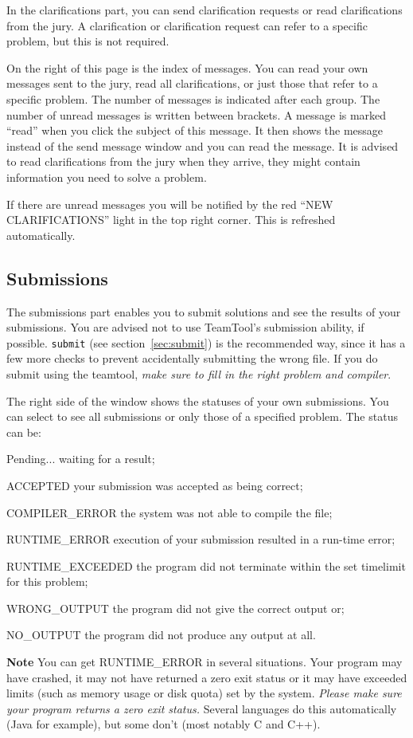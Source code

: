\documentclass[a4paper]{artikel3}
\newcommand{\cmd}[1]{\texttt{#1}}
\newcommand{\strong}[1]{\textbf{#1}}
\newenvironment{ddlist}[1]%
  {\begin{list}{}{\settowidth{\labelwidth}{\textbf{#1}}
   \setlength{\leftmargin}{\labelwidth}
   \addtolength{\leftmargin}{\labelsep}
   \renewcommand{\makelabel}[1]{\textbf{\hfill##1}}}}%
  {\end{list}}
\begin{document}
In the clarifications part, you can send clarification requests or read
clarifications from the jury. A clarification or clarification request can
refer to a specific problem, but this is not required.

On the right of this page is the index of messages. You can read your own
messages sent to the jury, read all clarifications, or just those that refer
to a specific problem. The number of messages is indicated after each group.
The number of unread messages is written between brackets. A message is
marked ``read'' when you click the subject of this message. It then shows
the message instead of the send message window and you can read the message.
It is advised to read clarifications from the jury when they arrive, they
might contain information you need to solve a problem.

If there are unread messages you will be notified by the red ``NEW
CLARIFICATIONS'' light in the top right corner. This is refreshed automatically.

\subsection{Submissions}

The submissions part enables you to submit solutions and see the results of
your submissions. You are advised not to use TeamTool's submission ability,
if possible. \cmd{submit} (see section~\ref{sec:submit}) is the recommended
way, since it has a few more checks to prevent accidentally submitting the
wrong file. If you do submit using the teamtool, \emph{make sure to fill in
the right problem and compiler}.

The right side of the window shows the statuses of your own submissions. You
can select to see all submissions or only those of a specified problem. The
status can be:

\begin{ddlist}{XRUNTIMEXEXCEEDED}
\item[Pending...] waiting for a result;
\item[ACCEPTED] your submission was accepted as being correct;
\item[COMPILER\_ERROR] the system was not able to compile the file;
\item[RUNTIME\_ERROR] execution of your submission resulted in a run-time
error;
\item[RUNTIME\_EXCEEDED] the program did not terminate within the set
timelimit for this problem;
\item[WRONG\_OUTPUT] the program did not give the correct output or;
\item[NO\_OUTPUT] the program did not produce any output at all.
\end{ddlist}

\strong{Note} You can get RUNTIME\_ERROR in several situations. Your program
may have crashed, it may not have returned a zero exit status or it may have
exceeded limits (such as memory usage or disk quota) set by the system.
\emph{Please make sure your program returns a zero exit status.} Several
languages do this automatically (Java for example), but some
don't (most notably C and C++).
\end{document}
